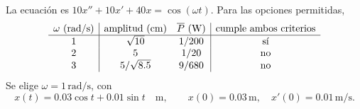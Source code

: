 La ecuación es \(10x''+10x'+40x=\cos(\omega t)\). Para las opciones permitidas,
\[
\begin{array}{c|cc|c}
\omega\ (\mathrm{rad/s})&\text{amplitud}\ (\mathrm{cm})&\overline P\ (\mathrm W)&\text{cumple ambos criterios}\\\hline
1&\sqrt{10}&1/200&\text{sí}\\
2&5&1/20&\text{no}\\
3&5/\sqrt{\smash[b]{8.5}}&9/680&\text{no}
\end{array}
\]
Se elige \(\omega=1\,\mathrm{rad/s}\), con
\[
x(t)=0.03\cos t+0.01\sin t\quad\mathrm m,
\qquad x(0)=0.03\,\mathrm m,\quad x'(0)=0.01\,\mathrm{m/s}.
\]
